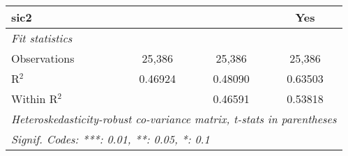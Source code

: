 \begin{tabular}{lccc}
   sic2          &                  &                  & Yes\\  
   \midrule
   \emph{Fit statistics}\\
   Observations  & 25,386           & 25,386           & 25,386\\  
   R$^2$         & 0.46924          & 0.48090          & 0.63503\\  
   Within R$^2$  &                  & 0.46591          & 0.53818\\  
   \midrule \midrule
   \multicolumn{4}{l}{\emph{Heteroskedasticity-robust co-variance matrix, t-stats in parentheses}}\\
   \multicolumn{4}{l}{\emph{Signif. Codes: ***: 0.01, **: 0.05, *: 0.1}}\\
\end{tabular}
\par\endgroup


